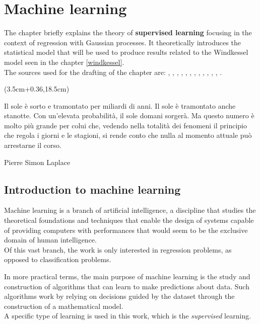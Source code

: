 \chapter{Machine learning}\label{machineLearning}

The chapter briefly explains the theory of \textbf{supervised learning} focusing in the context of regression with Gaussian processes. It theoretically introduces the statistical model that will be used to produce results related to the Windkessel model seen in the chapter \ref{windkessel}.\\
The sources used for the drafting of the chapter are: \cite{murphy_probabilistic_2022}, \cite{wiki:datasets}, \cite{wiki:overfitting}, \cite{pytorch:R2score}, \cite{wang_intuitive_2022}, \cite{noauthor_tutorial_nodate}, \cite{murphy_machine_2012}, \cite{gelman_bayesian_1995}, \cite{wiki:gradientDescend}, \cite{ruder_2022}, \cite{kingma_adam_2017}, \cite{JMLR:v12:duchi11a}, \cite{bottou2012stochastic}.


\begin{textblock*}{0.64\textwidth}(3.5cm+0.36\textwidth,18.5cm)
\epigraph{Il sole è sorto e tramontato per miliardi di anni. Il sole è tramontato anche stanotte. Con un'elevata probabilità, il sole domani sorgerà. Ma questo numero è molto più grande per colui che, vedendo nella totalità dei fenomeni il principio che regola i giorni e le stagioni, si rende conto che nulla al momento attuale può arrestarne il corso.}{Pierre Simon Laplace}
\end{textblock*}

\newpage

\section{Introduction to machine learning}
Machine learning is a branch of artificial intelligence, a discipline that studies the theoretical foundations and techniques that enable the design of systems capable of providing computers with performances that would seem to be the exclusive domain of human intelligence.\\
Of this vast branch, the work is only interested in regression problems, as opposed to classification problems.

In more practical terms, the main purpose of machine learning is the study and construction of algorithms that can learn to make predictions about data. Such algorithms work by relying on decisions guided by the dataset through the construction of a mathematical model.\\
A specific type of learning is used in this work, which is the \textit{supervised} learning.

